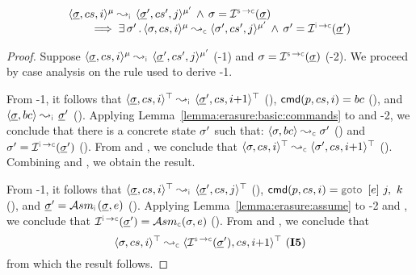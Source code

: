 \begin{lemma}\label{erasure:control:flow:cmds}
$$
\begin{array}{l} 
\abssemrule{\istate, \cs, i}{\istate', \cs', j}{\mode}{\mode'}{\instrumented} 
     \, \wedge \, \jstate = \interpret{\symbconc}{}(\istate) \\ \quad \quad
     \implies 
        \exists \, \jstate' \, . \, \abssemrule{\jstate, \cs, i}{\jstate', \cs', j}{\mode}{\mode'}{\concrete} 
         \, \wedge \, 
            \jstate' = \interpret{\instconc}{}(\istate') 
 \end{array}
$$
\end{lemma}
\begin{proof}
Suppose $\abssemrule{\istate, \cs, i}{\istate', \cs', j}{\mode}{\mode'}{\instrumented}$ (\hyp{1}) and 
$\jstate = \interpret{\symbconc}{}(\istate)$ (\hyp{2}).
We proceed by case analysis on the rule used to derive \hyp{1}. 
\vspace{3pt}

\noindent {} 
From \hyp{1}, it follows that $\abssemrule{\istate, \cs, i}{\istate', \cs, i{+}1}{\top}{\top}{\instrumented}$ (), 
$\ccmd[\prog][\cs]{i} = \bcmd$ (), and $\absbsemrule{\istate, \bcmd}{\istate'}{\instrumented}$ (). 
Applying Lemma~\ref{lemma:erasure:basic:commands} to  and \hyp{2}, we conclude that 
there is a concrete state $\sigma'$ such that: 
$\absbsemrule{\jstate, \bcmd}{\jstate'}{\concrete}$ () and $\jstate' = \interpret{\instconc}{}(\istate')$ (). 
From  and , we conclude that $\abssemrule{\jstate, \cs, i}{\jstate', \cs, i{+}1}{\top}{\top}{\concrete}$ (). 
 Combining  and , we obtain the result.  
 \vspace{5pt}


\noindent {} 
From \hyp{1}, it follows that $\abssemrule{\istate, \cs, i}{\istate', \cs, j}{\top}{\top}{\instrumented}$ (), 
$\ccmd[\prog][\cs]{i} =  \ifgoto{\jsilexpr}{j}{k}$ (), and 
$ \istate' = \absassume{\instrumented}(\istate, \jsilexpr)$ (). 
Applying Lemma~\ref{lemma:erasure:assume} to \hyp{2} and , we conclude that 
$\interpret{\instconc}{}(\istate') = \absassume{\concrete}(\jstate, \jsilexpr)$ ().  
From  and , we conclude that 
$$\abssemrule{\jstate, \cs, i}{\interpret{\symbconc}{}(\istate'), \cs, i{+}1}{\top}{\top}{\concrete} \text{ (\ieq{5})}$$
from which the result follows.      
 \vspace{5pt}
 

\end{proof}
